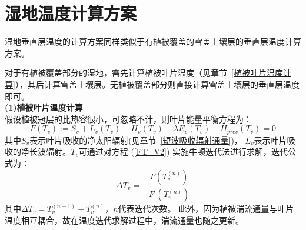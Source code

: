 \section{湿地温度计算方案}
湿地垂直层温度的计算方案同样类似于有植被覆盖的雪盖土壤层的垂直层温度计算方案。

对于有植被覆盖部分的湿地，需先计算植被叶片温度（见章节~\ref{植被叶片温度计算}），其后计算雪盖土壤层。无植被覆盖部分则直接计算雪盖土壤层的垂直层温度即可。\\

\textbf {(1)植被叶片温度计算}\\

假设植被冠层的比热容很小，可忽略不计，则叶片能量平衡方程为：
\begin{equation}\label{FT_V2}
F\left(T_{v}\right):=S_{v}+L_{v}\left(T_{v}\right)-H_{v}\left(T_{v}\right)-\lambda E_{v}\left(T_{v}\right)+H_{p r c v}\left(T_{v}\right)=0
\end{equation}
其中$S_v$表示叶片吸收的净太阳辐射(见章节~\ref{短波吸收辐射通量})，
$L_v$表示叶片吸收的净长波辐射。$T_v$可通过对方程 (\ref{FT_V2}) 实施牛顿迭代法进行求解，迭代公式为：
\begin{equation}
\Delta T_{v}=-\frac{F\left(T_{v}^{(n)}\right)}{F^{\prime}\left(T_{v}^{(n)}\right)}
\end{equation}
其中$\Delta T_v=T_v^{\left(n+1\right)}-T_v^{\left(n\right)}$，$n$代表迭代次数。
此外，因为植被湍流通量与叶片温度相互耦合，故在温度迭代求解过程中，湍流通量也随之更新。

